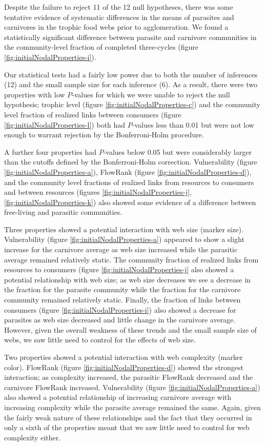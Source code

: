 \documentclass[../dissertation.tex]{subfiles}
\begin{document}
Despite the failure to reject 11 of the 12 null hypotheses, there was some
tentative evidence of systematic differences in the means of parasites and
carnivores in the trophic food webs prior to agglomeration. We found a
statistically significant difference between parasite and carnivore communities
in the community-level fraction of completed three-cycles (figure
\ref{fig:initialNodalProperties-i}).

Our statistical tests had a fairly low power due to both the number of
inferences (12) and the small sample size for each inference (6). As a result,
there were two properties with low $P$-values for which we were unable to
reject the null hypothesis; trophic level (figure
\ref{fig:initialNodalProperties-c}) and the community level fraction of realized
links between consumers (figure \ref{fig:initialNodalProperties-l}) both had
$P$-values less than 0.01 but were not low enough to warrant rejection by the
Bonferroni-Holm procedure.  

A further four properties had $P$-values below 0.05 but were considerably
larger than the cutoffs defined by the Bonferroni-Holm correction.
Vulnerability (figure \ref{fig:initialNodalProperties-a}), FlowRank (figure
\ref{fig:initialNodalProperties-d}), and the community level fractions of
realized links from resources to consumers and between resources (figures
\ref{fig:initialNodalProperties-j}, \ref{fig:initialNodalProperties-k}) also showed
some evidence of a difference between free-living and parasitic communities. 

Three properties showed a potential interaction with web size (marker size).
Vulnerability (figure \ref{fig:initialNodalProperties-a}) appeared to show a
slight increase for the carnivore average as web size increased while the
parasitic average remained relatively static. The community fraction of
realized links from resources to consumers (figure
\ref{fig:initialNodalProperties-j} also showed a potential relationship with
web size; as web size decreases we see a decrease in the fraction for the
parasite community while the fraction for the carnivore community remained
relatively static.  Finally, the fraction of links between consumers (figure
\ref{fig:initialNodalProperties-i}) also showed a decrease for parasites as web
size decreased and little change in the carnivore average.  However, given the
overall weakness of these trends and the small sample size of webs, we saw
little need to control for the effects of web size.

Two properties showed a potential interaction with web complexity (marker
color). FlowRank (figure \ref{fig:initialNodalProperties-d}) showed the
strongest interaction; as complexity increased, the parasitic FlowRank
decreased and the carnivore FlowRank increased. Vulnerability (figure
\ref{fig:initialNodalProperties-a}) also showed a potential relationship of
increasing carnivore average with increasing complexity while the parasite
average remained the same. Again, given the fairly weak nature of these
relationships and the fact that they occurred in only a sixth of the properties
meant that we saw little need to control for web complexity either.
\end{document}
